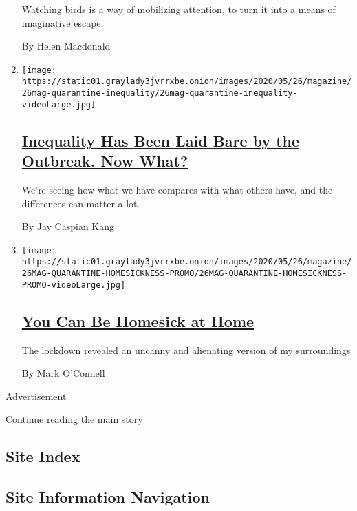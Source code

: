 \begin{enumerate}
  Watching birds is a way of mobilizing attention, to turn it into a
  means of imaginative escape.

  By Helen Macdonald
\item
  \texttt{[image: https://static01.graylady3jvrrxbe.onion/images/2020/05/26/magazine/26mag-quarantine-inequality/26mag-quarantine-inequality-videoLarge.jpg]}

  \hypertarget{inequality-has-been-laid-bare-by-the-outbreak-now-what}{%
  \subsection{\texorpdfstring{\href{/interactive/2020/05/20/magazine/covid-quarantine-inequality.html}{Inequality
  Has Been Laid Bare by the Outbreak. Now
  What?}}{Inequality Has Been Laid Bare by the Outbreak. Now What?}}\label{inequality-has-been-laid-bare-by-the-outbreak-now-what}}

  We're seeing how what we have compares with what others have, and the
  differences can matter a lot.

  By Jay Caspian Kang
\item
  \texttt{[image: https://static01.graylady3jvrrxbe.onion/images/2020/05/26/magazine/26MAG-QUARANTINE-HOMESICKNESS-PROMO/26MAG-QUARANTINE-HOMESICKNESS-PROMO-videoLarge.jpg]}

  \hypertarget{you-can-be-homesick-at-home}{%
  \subsection{\texorpdfstring{\href{/interactive/2020/05/18/magazine/covid-quarantine-homesick.html}{You
  Can Be Homesick at
  Home}}{You Can Be Homesick at Home}}\label{you-can-be-homesick-at-home}}

  The lockdown revealed an uncanny and alienating version of my
  surroundings

  By Mark O'Connell
\end{enumerate}

Advertisement

\protect\hyperlink{after-mid1}{Continue reading the main story}

\hypertarget{site-index}{%
\subsection{Site Index}\label{site-index}}

\hypertarget{site-information-navigation}{%
\subsection{Site Information
Navigation}\label{site-information-navigation}}

